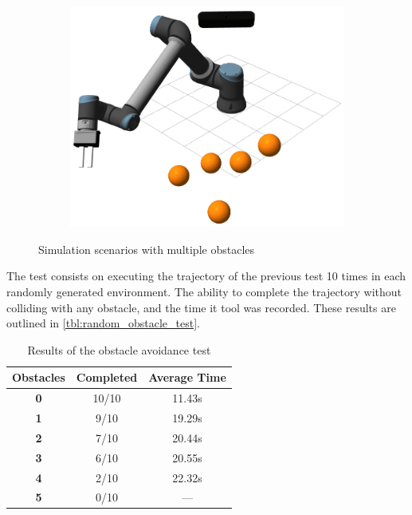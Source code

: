 \begin{figure}[h]
\begin{subfigure}{.2\linewidth}
        \includegraphics[width=.95\linewidth]{figs/chp6/obstacle_5.png}
    \end{subfigure}
    \caption{Simulation scenarios with multiple obstacles}
    \label{fig:mult_obstacle_test}
\end{figure}

\par The test consists on executing the trajectory of the previous test 10 times in each randomly generated environment. The ability to complete the trajectory without colliding with any obstacle, and the time it tool was recorded. These results are outlined in \autoref{tbl:random_obstacle_test}.

\begin{table}[h]
    \centering
    \begin{tabular}{|c|c|c|}
    \hline
    \textbf{Obstacles} & \textbf{Completed} & \textbf{Average Time} \\ \hline
    \textbf{0} & 10/10 & 11.43s \\ \hline
    \textbf{1} & 9/10 & 19.29s \\ \hline
    \textbf{2} & 7/10 & 20.44s \\ \hline
    \textbf{3} & 6/10 & 20.55s \\ \hline
    \textbf{4} & 2/10 & 22.32s \\ \hline
    \textbf{5} & 0/10 & --- \\ \hline
    \end{tabular}
    \caption{Results of the obstacle avoidance test}
    \label{tbl:random_obstacle_test}
\end{table}

